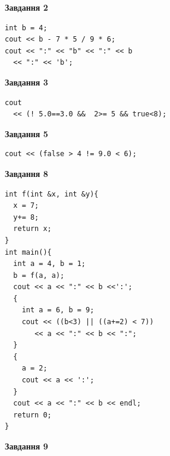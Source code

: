 \documentclass[12pt, ukrainian]{article}
\begin{document}
{\begin {large}
\begin{minipage}[t]{7.0cm}
\end{minipage}
\vline \hspace{1mm}
\begin{minipage}[t]{11.0cm}

\begin{center}
\textbf{Завдання 2}
\end{center}
\vspace{-8mm}

\begin{verbatim}
int b = 4;
cout << b - 7 * 5 / 9 * 6;
cout << ":" << "b" << ":" << b 
  << ":" << 'b';
\end{verbatim}



\begin{center}
\textbf{Завдання 3}
\end{center}
\vspace{-8mm}

\begin{verbatim}
cout 
  << (! 5.0==3.0 &&  2>= 5 && true<8);
\end{verbatim}



\begin{center}
\textbf{Завдання 5}
\end{center}
\vspace{-8mm}

\begin{verbatim}
cout << (false > 4 != 9.0 < 6);
\end{verbatim}



\begin{center}
\textbf{Завдання 8}
\end{center}
\vspace{-8mm}

\begin{verbatim}
int f(int &x, int &y){
  x = 7;
  y+= 8;
  return x;
}
int main(){
  int a = 4, b = 1;
  b = f(a, a);
  cout << a << ":" << b <<':';
  {
    int a = 6, b = 9;
    cout << ((b<3) || ((a+=2) < 7))
       << a << ":" << b << ":";
  }
  {
    a = 2;
    cout << a << ':';
  }
  cout << a << ":" << b << endl;
  return 0;
}
\end{verbatim}

\end{minipage}


\begin{minipage}[t]{7.0cm}

\begin{center}
\textbf{Завдання 9}
\end{center}
\vspace{-8mm}


\end{minipage}
\end{large}}
\end{document}
